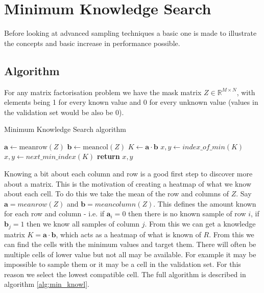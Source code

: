 \section{Minimum Knowledge Search}
\label{sec:mks_alg}
Before looking at advanced sampling techniques a basic one is made to illustrate the concepts and basic increase in performance possible.
\subsection{Algorithm}
For any matrix factorisation problem we have the mask matrix $Z \in \mathbb{R}^{M \times N}$, with elements being 1 for every known value and 0 for every unknown value (values in the validation set would be also be $0$).

\begin{algorithm}
\caption{Minimum Knowledge Search algorithm}\label{alg:min_knowl}
\begin{algorithmic}[1]
\State $\mathbf{a} \gets \text{meanrow}(Z)$ 
\State $\mathbf{b} \gets \text{meancol}(Z)$ 
\State $K \gets \mathbf{a} \cdot \mathbf{b}$ 
\State $x,y \gets index\_of\_min(K)$ 
\State $x,y \gets next\_min\_index(K)$
\EndWhile
\State \textbf{return} $x,y$
\EndProcedure
\end{algorithmic}
\end{algorithm}

Knowing a bit about each column and row is a good first step to discover more about a matrix. This is the motivation of creating a heatmap of what we know about each cell. To do this we take the mean of the row and columns of $Z$. Say $\mathbf{a}=meanrow(Z)$ and $\mathbf{b}=meancolumn(Z)$. This defines the amount known for each row and column - i.e. if $\mathbf{a}_i = 0$ then there is no known sample of row $i$, if $\mathbf{b}_j = 1$ then we know all samples of column $j$. From this we can get a knowledge matrix $K= \mathbf{a} \cdot \mathbf{b}$, which acts as a heatmap of what is known of $R$. From this we can find the cells with the minimum values and target them. There will often be multiple cells of lower value but not all may be available. For example it may be impossible to sample them or it may be a cell in the validation set. For this reason we select the lowest compatible cell. The full algorithm is described in algorithm \ref{alg:min_knowl}.

